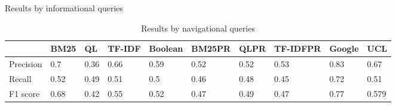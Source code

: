 \begin{table*}[!t]
    \begin{subtable}{.5\textwidth}
    \centering
    \caption{Results by informational queries}
    \label{inform}
    \resizebox{\columnwidth}{!}
    {
      \begin{tabular}{|l|l|l|l|l|l|l|l|l|l|}
      \hline
                & BM25  & QL & TF-IDF &Boolean& BM25PR &QLPR&TF-IDFPR&Google&UCL  \\ \hline
      Precision & 0.7  & 0.36  & 0.66 & 0.59 &0.52&0.52&0.53&0.83&0.67 \\ \hline
      Recall    & 0.52& 0.49   & 0.51 & 0.5 &0.46&0.48&0.45&0.72&0.51 \\ \hline
      F1 score  & 0.68 & 0.42   & 0.55  & 0.52&0.47&0.49&0.47&0.77&0.579\\ \hline
      \end{tabular}
    }
    \end{subtable}%
    \begin{subtable}{.5\textwidth}
    \centering
    \caption{Results by navigational queries}


\end{subtable}
\end{table*}
